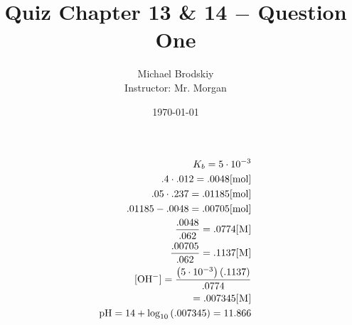 \documentclass[12pt]{article}
\title{Quiz Chapter 13 \& 14 $-$ Question One}
\date{\today}
\author{Michael Brodskiy\\ \small Instructor: Mr. Morgan}
\begin{document}
\maketitle

\begin{equation}
  \begin{split}
    K_b=5\cdot10^{-3}\\
    .4\cdot.012=.0048[\si{\mole}]\\
    .05\cdot.237=.01185[\si{\mole}]\\
    .01185-.0048=.00705[\si{\mole}]\\
    \frac{.0048}{.062}=.0774[\textsc{M}]\\
    \frac{.00705}{.062}=.1137[\textsc{M}]\\
    [\ce{OH-}]=\frac{\left(5\cdot10^{-3}\right)\left( .1137 \right)}{.0774}\\
    =.007345[\textsc{M}]\\
    \ce{pH}=14+\log_{10}\left( .007345  \right)=11.866
  \end{split}
  \label{1}
\end{equation}
\end{document}
